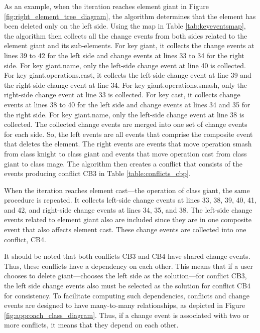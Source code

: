 As an example, when the iteration reaches element \textsf{giant} in Figure \ref{fig:right_element_tree_diagram}, the algorithm determines that the element has been deleted only on the left side.
Using the map in Table \ref{tab:keyeventsmap}, the algorithm then collects all the change events from both sides related to the element \textsf{giant} and its sub-elements. For key \textsf{giant}, it collects the change events at lines 39 to 42 for the left side and change events at lines 33 to 34 for the right side. For key \textsf{giant.name}, only the left-side change event at line 40 is collected.
For key \textsf{giant.operations.cast}, it collects the left-side change event at line 39 and the right-side change event at line 34.
For key \textsf{giant.operations.smash}, only the right-side change event at line 33 is collected.
For key \textsf{cast}, it collects change events at lines 38 to 40 for the left side and change events at lines 34 and 35 for the right side.
For key \textsf{giant.name}, only the left-side change event at line 38 is collected.
The collected change events are merged into one set of change events for each side.
So, the left events are all events that comprise the composite event that deletes the element.
The right events are events that move operation \textsf{smash} from class \textsf{knight} to class \textsf{giant} and events that
move operation \textsf{cast} from class \textsf{giant} to class \textsf{mage}. The algorithm then creates a conflict that consists of the events producing conflict \textsf{CB3} in Table \ref{table:conflicts_cbp}.

When the iteration reaches element \textsf{cast}—the operation of class \textsf{giant}, the same procedure is repeated. It collects left-side change events at lines 33, 38, 39, 40, 41, and 42, and right-side change events at lines 34, 35, and 38. The left-side change events related to element \textsf{giant} also are included since they are in one composite event that also affects element \textsf{cast}. These change events are collected into one conflict, \textsf{CB4}.

It should be noted that both conflicts \textsf{CB3} and \textsf{CB4} have shared change events. Thus, these conflicts have a dependency on each other. This means that if a user chooses to delete \textsf{giant}—chooses the left side as the solution—for conflict \textsf{CB3}, the left side change events also must be selected as the solution for conflict \textsf{CB4} for consistency. To facilitate computing such dependencies, conflicts and change events are designed to have many-to-many relationships, as depicted in Figure \ref{fig:approach_class_diagram}. Thus, if a change event is associated with two or more conflicts, it means that they depend on each other.

